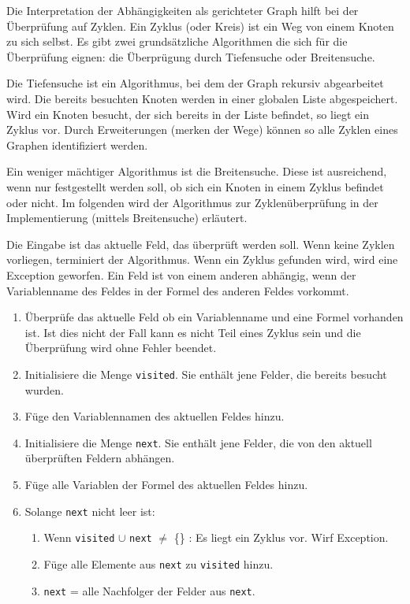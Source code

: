 Die Interpretation der Abhängigkeiten als gerichteter Graph hilft bei der Überprüfung auf Zyklen. Ein Zyklus (oder Kreis) ist ein Weg von einem Knoten zu sich selbst\cite{Schl08}. Es gibt zwei grund\-sätz\-liche Algorithmen die sich für die Überprüfung eignen: die Überprügung durch Tiefensuche oder Breitensuche.

Die Tiefensuche ist ein Algorithmus, bei dem der Graph rekursiv abgearbeitet wird. Die bereits besuchten Knoten werden in einer globalen Liste abge\-spei\-chert. Wird ein Knoten besucht, der sich bereits in der Liste befindet, so liegt ein Zyklus vor. Durch Erweiterungen (merken der Wege) können so alle Zyklen eines Graphen identifiziert werden.

Ein weniger mächtiger Algorithmus ist die Breitensuche. Diese ist ausreichend, wenn nur festgestellt werden soll, ob sich ein Knoten in einem Zyklus befindet oder nicht. Im folgenden wird der Algorithmus zur Zyklenüberprüfung in der Implementierung (mittels Breitensuche) erläutert.

Die Eingabe ist das aktuelle Feld, das überprüft werden soll. Wenn keine Zyklen vorliegen, terminiert der Algorithmus. Wenn ein Zyklus gefunden wird, wird eine Exception geworfen. Ein Feld ist von einem anderen abhängig, wenn der Variablenname des Feldes in der Formel des anderen Feldes vorkommt.

\begin{enumerate}
  \item Überprüfe das aktuelle Feld ob ein Variablenname und eine Formel vorhanden ist. Ist dies nicht der Fall kann es nicht Teil eines Zyklus sein und die Überprüfung wird ohne Fehler beendet.
  
  \item Initialisiere die Menge \texttt{visited}. Sie enthält jene Felder, die bereits besucht wurden. 

  \item Füge den Variablennamen des aktuellen Feldes hinzu.

  \item Initialisiere die Menge \texttt{next}. Sie enthält jene Felder, die von den aktuell überprüften Feldern abhängen.

  \item Füge alle Variablen der Formel des aktuellen Feldes hinzu.

  \item Solange \texttt{next} nicht leer ist:

    \begin{enumerate}
      \item Wenn \texttt{visited} $\cup$ \texttt{next} $\neq$ \{\} : Es liegt ein Zyklus vor. Wirf Exception.
      \item Füge alle Elemente aus \texttt{next} zu \texttt{visited} hinzu.
      \item \texttt{next} = alle Nachfolger der Felder aus \texttt{next}.
    \end{enumerate}
\end{enumerate}


